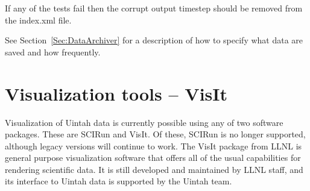 If any of the tests fail then the corrupt output timestep should be removed from the index.xml file.


See Section~\ref{Sec:DataArchiver} for a description of how to specify
what data are saved and how frequently.









\chapter{Visualization tools -- VisIt}

Visualization of Uintah data is currently possible using any of two
software packages.  These are SCIRun and VisIt.  Of these, SCIRun is
no longer supported, although legacy versions will continue to work.
The VisIt package from LLNL is general purpose visualization software
that offers all of the usual capabilities for rendering scientific
data.  It is still developed and maintained by LLNL staff, and its
interface to Uintah data is supported by the Uintah team.



